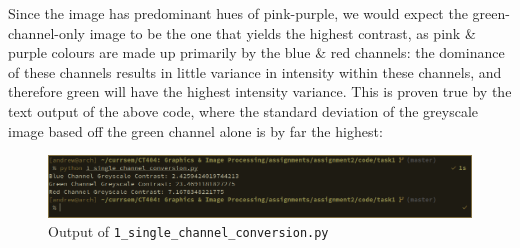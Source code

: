 \documentclass[a4paper]{article}
\begin{document}
Since the image has predominant hues of pink-purple, we would expect the green-channel-only image to be the one that yields the highest contrast, as pink \& purple colours are made up primarily by the blue \& red channels: the dominance of these channels results in little variance in intensity within these channels, and therefore green will have the highest intensity variance.
This is proven true by the text output of the above code, where the standard deviation of the greyscale image based off the green channel alone is by far the highest:
\begin{figure}[H]
    \centering
    \includegraphics[width=\textwidth]{./images/1_single_channel_conversion_output.png}
    \caption{Output of \texttt{1_single_channel_conversion.py}}
\end{figure}
\end{document}
